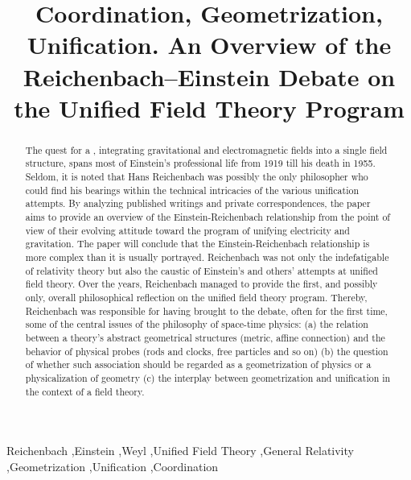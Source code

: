 \documentclass[final]{article}
\title{Coordination, Geometrization, Unification. An Overview of the Reichenbach--Einstein Debate on the Unified Field Theory Program}
\begin{document}
\maketitle

\begin{abstract}
The quest for a , integrating gravitational and electromagnetic fields into a single field structure, spans most of Einstein's professional life from 1919 till his death in 1955. Seldom, it is noted that Hans Reichenbach was possibly the only philosopher who could find his bearings within the technical intricacies of the various unification attempts. By analyzing published writings and private correspondences, the paper aims to provide an overview of the Einstein-Reichenbach relationship from the point of view of their evolving attitude toward the program of unifying electricity and gravitation. The paper will conclude that the Einstein-Reichenbach relationship is more complex than it is usually portrayed. Reichenbach was not only the indefatigable  of relativity theory but also the caustic  of Einstein's and others' attempts at unified field theory. Over the years, Reichenbach managed to provide the first, and possibly only, overall philosophical reflection on the unified field theory program. Thereby, Reichenbach was responsible for having brought to the debate, often for the first time, some of the central issues of the philosophy of space-time physics: (a) the relation between a theory's abstract geometrical structures (metric, affine connection) and the behavior of physical probes (rods and clocks, free particles and so on) (b) the question of whether such association should be regarded as a geometrization of physics or a physicalization of geometry (c) the interplay between geometrization and unification in the context of a field theory.
\end{abstract}


\begin{keywords}
Reichenbach \sep Einstein \sep Weyl \sep Unified Field Theory \sep General Relativity \sep Geometrization \sep Unification \sep Coordination	
\end{keywords}
\end{document}
